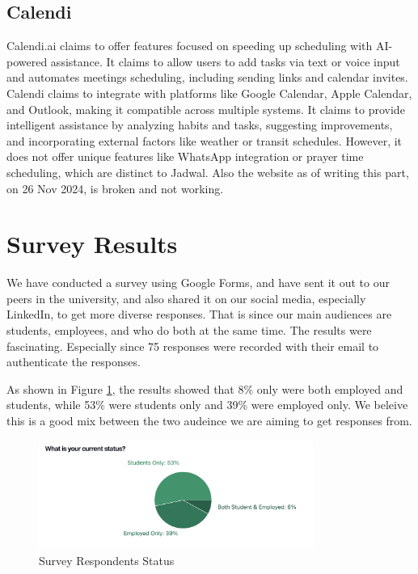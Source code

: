 \documentclass[12pt,a4paper]{report}
\begin{document}
\subsection{Calendi}

Calendi.ai claims to offer features focused on speeding up scheduling with AI-powered assistance. It claims to allow users to add tasks via text or voice input and automates meetings scheduling, including sending links and calendar invites. Calendi claims to integrate with platforms like Google Calendar, Apple Calendar, and Outlook, making it compatible across multiple systems. It claims to provide intelligent assistance by analyzing habits and tasks, suggesting improvements, and incorporating external factors like weather or transit schedules. However, it does not offer unique features like WhatsApp integration or prayer time scheduling, which are distinct to Jadwal. Also the website as of writing this part, on 26 Nov 2024, is broken and not working.

\section{Survey Results}

We have conducted a survey using Google Forms, and have sent it out to our peers in the university, and also shared it on our social media, especially LinkedIn, to get more diverse responses. That is since our main audiences are students, employees, and who do both at the same time. The results were fascinating. Especially since 75 responses were recorded with their email to authenticate the responses.

As shown in Figure \ref{fig:survey-status}, the results showed that 8\% only were both employed and students, while 53\% were students only and 39\% were employed only. We beleive this is a good mix between the two audeince we are aiming to get responses from.

\begin{figure}[!h]
    \centering
    \includegraphics[width=0.8\textwidth]{images/survey/status.png}
    \caption{Survey Respondents Status}
    \label{fig:survey-status}
\end{figure}
\end{document}
